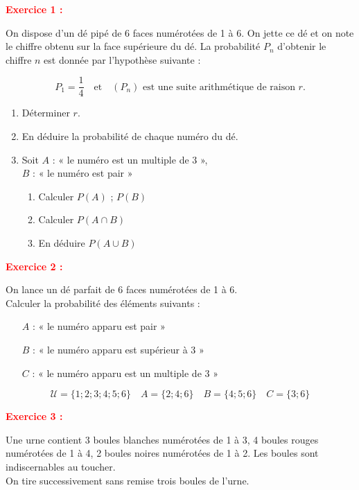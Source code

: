 \documentclass[12pt]{article}
\begin{document}
\textbf{\textcolor{red}{Exercice 1 :}}

On dispose d’un dé pipé de 6 faces numérotées de 1 à 6. On jette ce dé et on note le chiffre obtenu sur la face supérieure du dé. La probabilité \( P_n \) d’obtenir le chiffre \( n \) est donnée par l’hypothèse suivante :

\[
P_1 = \frac{1}{4} \quad \text{et} \quad (P_n) \text{ est une suite arithmétique de raison } r.
\]

\begin{enumerate}
    \item Déterminer \( r \).
    \item En déduire la probabilité de chaque numéro du dé.
    \item Soit \( A \) : « le numéro est un multiple de 3 »,\\
          \hspace*{0.7cm} \( B \) : « le numéro est pair »
    \begin{enumerate}
        \item Calculer \( P(A) \) ; \( P(B) \)
        \item Calculer \( P(A \cap B) \)
        \item En déduire \( P(A \cup B) \)
    \end{enumerate}
\end{enumerate}

\vspace{1cm}

\textbf{\textcolor{red}{Exercice 2 :}}

On lance un dé parfait de 6 faces numérotées de 1 à 6.\\
Calculer la probabilité des éléments suivants :

\begin{itemize}
    \item[$A$ :] « le numéro apparu est pair »
    \item[$B$ :] « le numéro apparu est supérieur à 3 »
    \item[$C$ :] « le numéro apparu est un multiple de 3 »
\end{itemize}

\[
\mathcal{U} = \{1 ; 2 ; 3 ; 4 ; 5 ; 6\}
\quad
A = \{2 ; 4 ; 6\}
\quad
B = \{4 ; 5 ; 6\}
\quad
C = \{3 ; 6\}
\]

\textbf{\textcolor{red}{Exercice 3 :}}

Une urne contient 3 boules blanches numérotées de 1 à 3, 4 boules rouges numérotées de 1 à 4, 2 boules noires numérotées de 1 à 2. Les boules sont indiscernables au toucher.\\
On tire successivement sans remise trois boules de l’urne.
\end{document}
